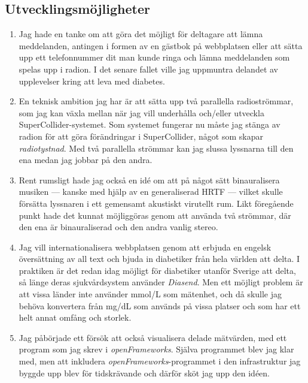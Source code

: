 \documentclass[11pt, a4paper]{article} %
\begin{document}
\subsection*{Utvecklingsmöjligheter}
  \begin{enumerate}
	\item Jag hade en tanke om att göra det möjligt för deltagare att lämna meddelanden, antingen i formen av en gästbok på webbplatsen eller att sätta upp ett telefonnummer dit man kunde ringa och lämna meddelanden som spelas upp i radion. I det senare fallet ville jag uppmuntra delandet av upplevelser kring att leva med diabetes.
	\item En teknisk ambition jag har är att sätta upp två parallella radioströmmar, som jag kan växla mellan när jag vill underhålla och/eller utveckla SuperCollider-systemet. Som systemet fungerar nu måste jag stänga av radion för att göra förändringar i SuperCollider, något som skapar \emph{radiotystnad}. Med två parallella strömmar kan jag slussa lyssnarna till den ena medan jag jobbar på den andra.
	\item Rent rumsligt hade jag också en idé om att på något sätt binauralisera musiken --- kanske med hjälp av en generaliserad HRTF --- vilket skulle försätta lyssnaren i ett gemensamt akustiskt virutellt rum. Likt föregående punkt hade det kunnat möjliggöras genom att använda två strömmar, där den ena är binauraliserad och den andra vanlig stereo.
	\item Jag vill internationalisera webbplatsen genom att erbjuda en engelsk översättning av all text och bjuda in diabetiker från hela världen att delta. I praktiken är det redan idag möjligt för diabetiker utanför Sverige att delta, så länge deras sjukvårdsystem använder \emph{Diasend}. Men ett möjligt problem är att vissa länder inte använder mmol/L som mätenhet, och då skulle jag behöva konvertera från mg/dL som används på vissa platser och som har ett helt annat omfång och storlek. 
	\item Jag påbörjade ett försök att också visualisera delade mätvärden, med ett program som jag skrev i \emph{openFrameworks}. Själva programmet blev jag klar med, men att inkludera \emph{openFrameworks}-programmet i den infrastruktur jag byggde upp blev för tidskrävande och därför sköt jag upp den idéen. 
  \end{enumerate}

\end{document}
